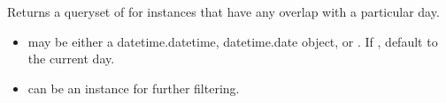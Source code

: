 \documentclass[letterpaper,10pt,english]{sphinxmanual}
\begin{document}
\begin{fulllineitems}
\begin{fulllineitems}
\label{generated/apps.reporting.models:apps.reporting.models.MeetingManager.range_occurences}
\end{fulllineitems}



\begin{fulllineitems}
\label{generated/apps.reporting.models:apps.reporting.models.MeetingManager.weekly_occurrences}
Returns a queryset of for instances that have any overlap with a 
particular day.
\begin{itemize}
\item {} 
 may be either a datetime.datetime, datetime.date object, or
. If , default to the current day.

\item {} 
 can be an  instance for further filtering.

\end{itemize}

\end{fulllineitems}


\end{fulllineitems}


\end{document}
